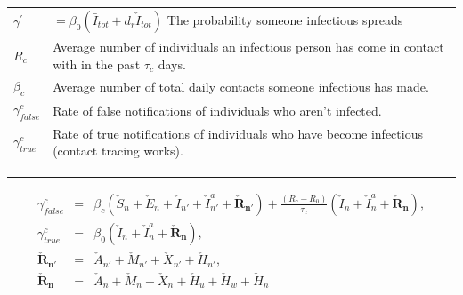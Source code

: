 \documentclass[notitlepage, superscriptaddress]{revtex4-2}
\begin{document}
\begin{table}[]
\begin{tabular}{ll}
$\gamma^{'}$                & $=\beta_{0} (\bar{I}_{tot} + d_{r} \check{I}_{tot})$  The probability someone infectious spreads      \\
$R_{c}$             & Average number of individuals an infectious person has come in contact with in the past $\tau_{c}$ days. \\
$\beta_{c}$                 & Average number of total daily contacts someone infectious has made.                                \\
$\gamma^{c}_{false}$        & Rate of false notifications of individuals who aren't infected.                                    \\
$\gamma^{c}_{true}$ & Rate of true notifications of individuals who have become infectious (contact tracing works).            \\
                            &                                                                                                    \\
                            &                                                                                                    \\
                            &                                                                                                   
\end{tabular}
\end{table}

\begin{eqnarray}
\gamma^{c}_{false} &=& \beta_{c} (\check{S}_{n} + \check{E}_{n} + \check{I}_{n'} + \check{I}^{a}_{n'} + \boldsymbol{\check{R}_{n'}}) + \frac{(R_{c}-R_{0})}{\tau_{c}}(\check{I}_{n} + \check{I}^{a}_{n} + \boldsymbol{\check{R}_{n}}), \\
%
\gamma^{c}_{true} &=& \beta_{0} (\check{I}_{n} + \check{I}^{a}_{n} + \boldsymbol{\check{R}_{n}}), \\ 
%
\boldsymbol{\check{R}_{n'}} &=& \check{A}_{n'} + \check{M}_{n'} + \check{X}_{n'} + \check{H}_{n'}, \\
%
\boldsymbol{\check{R}_{n}} &=& \check{A}_{n} + \check{M}_{n} + \check{X}_{n} + \check{H}_{u} + \check{H}_{w} + \check{H}_{n}
\end{eqnarray}
\end{document}
